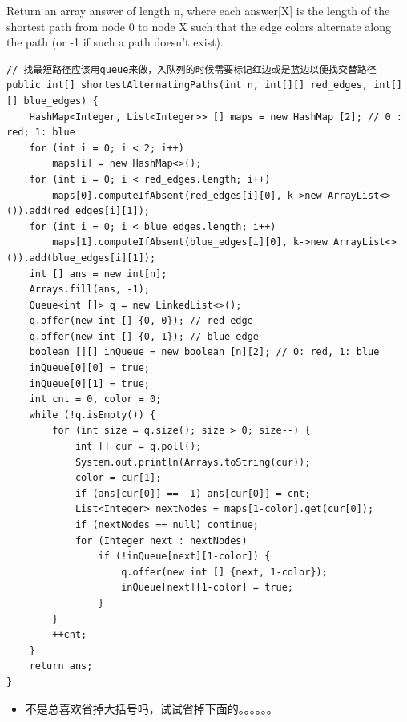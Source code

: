 \documentclass[9pt, b5paaper]{book}
\begin{document}
Return an array answer of length n, where each answer[X] is the length of the shortest path from node 0 to node X such that the edge colors alternate along the path (or -1 if such a path doesn't exist).
\begin{verbatim}
// 找最短路径应该用queue来做，入队列的时候需要标记红边或是蓝边以便找交替路径
public int[] shortestAlternatingPaths(int n, int[][] red_edges, int[][] blue_edges) {
    HashMap<Integer, List<Integer>> [] maps = new HashMap [2]; // 0 : red; 1: blue
    for (int i = 0; i < 2; i++) 
        maps[i] = new HashMap<>();
    for (int i = 0; i < red_edges.length; i++) 
        maps[0].computeIfAbsent(red_edges[i][0], k->new ArrayList<>()).add(red_edges[i][1]);
    for (int i = 0; i < blue_edges.length; i++) 
        maps[1].computeIfAbsent(blue_edges[i][0], k->new ArrayList<>()).add(blue_edges[i][1]);
    int [] ans = new int[n];
    Arrays.fill(ans, -1);
    Queue<int []> q = new LinkedList<>();
    q.offer(new int [] {0, 0}); // red edge         
    q.offer(new int [] {0, 1}); // blue edge
    boolean [][] inQueue = new boolean [n][2]; // 0: red, 1: blue
    inQueue[0][0] = true;
    inQueue[0][1] = true;
    int cnt = 0, color = 0;
    while (!q.isEmpty()) {
        for (int size = q.size(); size > 0; size--) {
            int [] cur = q.poll();
            System.out.println(Arrays.toString(cur));
            color = cur[1];
            if (ans[cur[0]] == -1) ans[cur[0]] = cnt;
            List<Integer> nextNodes = maps[1-color].get(cur[0]);
            if (nextNodes == null) continue;
            for (Integer next : nextNodes) 
                if (!inQueue[next][1-color]) {
                    q.offer(new int [] {next, 1-color});
                    inQueue[next][1-color] = true;
                }
        }
        ++cnt;
    }
    return ans;
}
\end{verbatim}
\begin{itemize}
\item 不是总喜欢省掉大括号吗，试试省掉下面的。。。。。。
\end{itemize}
\end{document}
